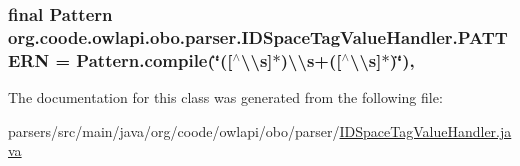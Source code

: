 \hypertarget{classorg_1_1coode_1_1owlapi_1_1obo_1_1parser_1_1_i_d_space_tag_value_handler_a8d1c8ac6f7a614d193e470f0c07648d3}{
\subsubsection[{P\-A\-T\-T\-E\-R\-N}]{\setlength{\rightskip}{0pt plus 5cm}final Pattern org.\-coode.\-owlapi.\-obo.\-parser.\-I\-D\-Space\-Tag\-Value\-Handler.\-P\-A\-T\-T\-E\-R\-N = Pattern.\-compile(\char`\"{}(\mbox{[}$^\wedge$\textbackslash{}\textbackslash{}s\mbox{]}$\ast$)\textbackslash{}\textbackslash{}s+(\mbox{[}$^\wedge$\textbackslash{}\textbackslash{}s\mbox{]}$\ast$)\char`\"{})\hspace{0.3cm}{\ttfamily [static]}, {\ttfamily [private]}}}\label{classorg_1_1coode_1_1owlapi_1_1obo_1_1parser_1_1_i_d_space_tag_value_handler_a8d1c8ac6f7a614d193e470f0c07648d3}


The documentation for this class was generated from the following file\-:\begin{DoxyCompactItemize}
\item 
parsers/src/main/java/org/coode/owlapi/obo/parser/\hyperlink{_i_d_space_tag_value_handler_8java}{I\-D\-Space\-Tag\-Value\-Handler.\-java}\end{DoxyCompactItemize}
